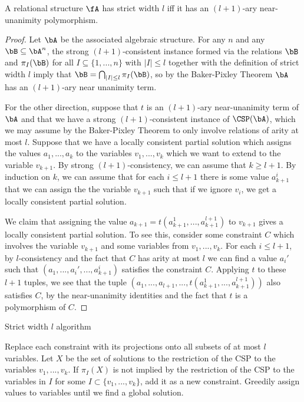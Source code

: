 \begin{thm} A relational structure $\fA$ has strict width $l$ iff it has an $(l+1)$-ary near-unanimity polymorphism.
\end{thm}
\begin{proof} Let $\bA$ be the associated algebraic structure. For any $n$ and any $\bB \subseteq \bA^n$, the strong $(l+1)$-consistent instance formed via the relations $\bB$ and $\pi_I(\bB)$ for all $I \subseteq \{1, ..., n\}$ with $|I| \le l$ together with the definition of strict width $l$ imply that $\bB = \bigcap_{|I| \le l} \pi_I(\bB)$, so by the Baker-Pixley Theorem $\bA$ has an $(l+1)$-ary near unanimity term.

For the other direction, suppose that $t$ is an $(l+1)$-ary near-unanimity term of $\bA$ and that we have a strong $(l+1)$-consistent instance of $\CSP(\bA)$, which we may assume by the Baker-Pixley Theorem to only involve relations of arity at most $l$. Suppose that we have a locally consistent partial solution which assigns the values $a_1, ..., a_k$ to the variables $v_1, ..., v_k$ which we want to extend to the variable $v_{k+1}$. By strong $(l+1)$-consistency, we can assume that $k \ge l+1$. By induction on $k$, we can assume that for each $i \le l+1$ there is some value $a_{k+1}^i$ that we can assign the the variable $v_{k+1}$ such that if we ignore $v_i$, we get a locally consistent partial solution.

We claim that assigning the value $a_{k+1} = t(a_{k+1}^1, ..., a_{k+1}^{l+1})$ to $v_{k+1}$ gives a locally consistent partial solution. To see this, consider some constraint $C$ which involves the variable $v_{k+1}$ and some variables from $v_1, ..., v_k$. For each $i \le l+1$, by $l$-consistency and the fact that $C$ has arity at most $l$ we can find a value $a_i'$ such that $(a_1, ..., a_i', ..., a_{k+1}^i)$ satisfies the constraint $C$. Applying $t$ to these $l+1$ tuples, we see that the tuple $(a_1, ..., a_{l+1}, ..., t(a_{k+1}^1, ..., a_{k+1}^{l+1}))$ also satisfies $C$, by the near-unanimity identities and the fact that $t$ is a polymorphism of $C$.
\end{proof}

\begin{algorithm}
\caption{Strict width $l$ algorithm}
\begin{algorithmic}[1]
\State Replace each constraint with its projections onto all subsets of at most $l$ variables.
\Repeat
{}
\State Let $X$ be the set of solutions to the restriction of the CSP to the variables $v_1, ..., v_k$.
\State If $\pi_I(X)$ is not implied by the restriction of the CSP to the variables in $I$ for some $I \subset \{v_1, ..., v_k\}$, add it as a new constraint.
\EndFor
{}
\State Greedily assign values to variables until we find a global solution.
\end{algorithmic}
\end{algorithm}

